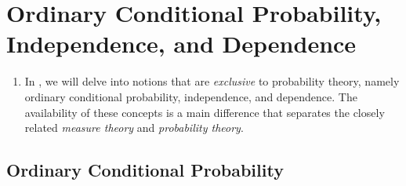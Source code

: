 \section{Ordinary Conditional Probability, Independence, and Dependence}
\label{sect:cond-prob-indep-dep}
\begin{enumerate}
\item In , we will delve into notions that are
\emph{exclusive} to probability theory, namely ordinary conditional
probability, independence, and dependence. The availability of these concepts
is a main difference that separates the closely related \emph{measure theory}
and \emph{probability theory}.
\end{enumerate}
\subsection{Ordinary Conditional Probability}
\label{subsect:ordinary-cond-prob}
